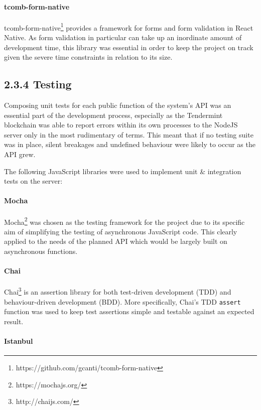 \documentclass[12pt]{report}
\let\oldparagraph\paragraph
\renewcommand{\paragraph}[1]{\oldparagraph{#1}\mbox{}}
\begin{document}
\paragraph{tcomb-form-native}\label{tcomb-form-native}

tcomb-form-native\footnote{https://github.com/gcanti/tcomb-form-native}
provides a framework for forms and form validation in React Native. As
form validation in particular can take up an inordinate amount of
development time, this library was essential in order to keep the
project on track given the severe time constraints in relation to its
size.

\subsection{2.3.4 Testing}\label{testing}

Composing unit tests for each public function of the system's API was an
essential part of the development process, especially as the Tendermint
blockchain was able to report errors within its own processes to the
NodeJS server only in the most rudimentary of terms. This meant that if
no testing suite was in place, silent breakages and undefined behaviour
were likely to occur as the API grew.

The following JavaScript libraries were used to implement unit \&
integration tests on the server:

\paragraph{Mocha}\label{mocha}

Mocha\footnote{https://mochajs.org/} was chosen as the testing
framework for the project due to its specific aim of simplifying the
testing of asynchronous JavaScript code. This clearly applied to the
needs of the planned API which would be largely built on asynchronous
functions.

\paragraph{Chai}\label{chai}

Chai\footnote{http://chaijs.com/} is an assertion library for both
test-driven development (TDD) and behaviour-driven development (BDD).
More specifically, Chai's TDD \texttt{assert} function was used to keep
test assertions simple and testable against an expected result.

\paragraph{Istanbul}\label{istanbul}
\end{document}
